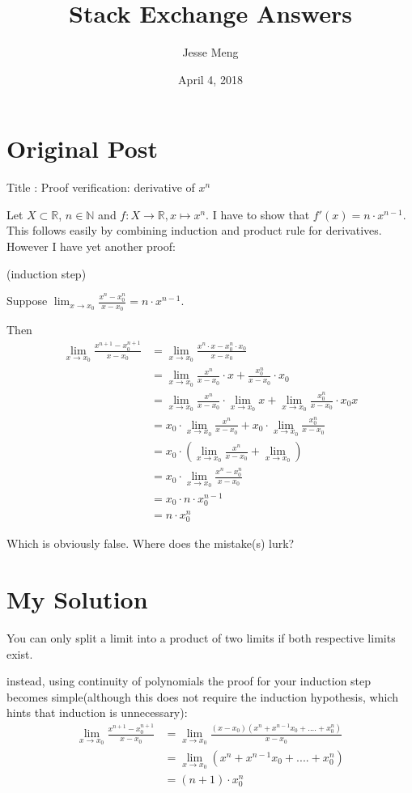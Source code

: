 \documentclass{article}
\title{Stack Exchange Answers}
\author{Jesse Meng }
\date{April 4, 2018}
\begin{document}
\maketitle

\section{Original Post}
Title : Proof verification: derivative of $x^n$

Let $X\subset\mathbb{R}$, $n\in \mathbb{N}$ and $f:X\to \mathbb{R}, x \mapsto x^n$. I have to show that $f'(x) = n \cdot x^{n-1}$. This follows easily by combining induction and product rule for derivatives. However I have yet another proof:

(induction step)

Suppose $\lim_{x\to x_0} \frac{x^{n} - x_{0}^{n}}{x - x_0} = n \cdot x^{n-1}$.

Then \begin{equation} \begin{array}{ll} 
\lim_{x\to x_0} \frac{x^{n+1} - x_{0}^{n+1}}{x - x_0} &= \lim_{x\to x_0} \frac{x^{n}\cdot x - x_{0}^{n} \cdot x_0}{x - x_0}\\
&=\lim_{x\to x_0} \frac{x^{n}}{x - x_0} \cdot x + \frac{x_{0}^{n}}{x-x_0} \cdot x_0\\
&=\lim_{x\to x_0} \frac{x^{n}}{x - x_0} \cdot \lim_{x\to x_0} x + \lim_{x\to x_0} \frac{x_{0}^{n}}{x-x_0} \cdot x_0x\\
&= x_0 \cdot \lim_{x\to x_0} \frac{x^{n}}{x - x_0} + x_0 \cdot \lim_{x\to x_0}
\frac{x_{0}^{n}}{x-x_0}\\
&= x_0 \cdot \left(\lim_{x\to x_0} \frac{x^{n}}{x - x_0} + \lim_{x\to x_0} \right)\\
&= x_0 \cdot \lim_{x\to x_0} \frac{x^{n} - x_{0}^{n}}{x - x_0}\\
&= x_0 \cdot n \cdot x_0^{n-1}\\
&= n \cdot x_0^{n}
\end{array} \end{equation}

Which is obviously false. Where does the mistake(s) lurk?
\section{My Solution}
You can only split a limit into a product of two limits if both respective limits exist.

instead, using continuity of polynomials the proof for your induction step becomes simple(although this does not require the induction hypothesis, which hints that induction is unnecessary):
\begin{equation} \begin{array}{ll} 
\lim_{x\to x_0} \frac{x^{n+1} - x_{0}^{n+1}}{x - x_0} &= \lim_{x\to x_0} \frac{(x-x_0)(x^n+x^{n-1}x_0+....+x_0^n)}{x - x_0}\\
&= \lim_{x\to x_0} (x^n+x^{n-1}x_0+....+x_0^n)\\
&= (n+1) \cdot x_0^{n}
\end{array} \end{equation}
\end{document}
